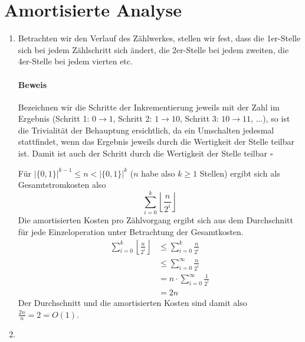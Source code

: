 \documentclass[a4paper,10pt]{article}
\begin{document}
\section{Amortisierte Analyse}
\begin{enumerate}
\item   Betrachten wir den Verlauf des Zählwerkes, stellen wir fest, dass die 1er-Stelle sich bei jedem Zählschritt sich 
        ändert, die 2er-Stelle bei jedem zweiten, die 4er-Stelle bei jedem vierten etc. 
        \paragraph*{Beweis} Bezeichnen wir die Schritte der Inkrementierung jeweils mit der Zahl im Ergebnis (Schritt 1: $0 \to 1$, Schritt 2: $1 \to 10$, Schritt 3: $10 \to 11$, ...), so ist die Trivialität der Behauptung ersichtlich, da ein Umschalten jedesmal stattfindet, wenn das Ergebnis jeweils durch die Wertigkeit der Stelle teilbar ist. Damit ist auch der Schritt durch die Wertigkeit der Stelle teilbar \hfill $\square$
        
        Für $\left|\{0,1\}\right|^{k-1} \leq n < \left|\{0,1\}\right|^{k}$ ($n$ habe also $k \geq 1$ Stellen) ergibt sich als Gesamtstromkosten also
        \[\sum\limits_{i=0}^{k} \left\lfloor\frac{n}{2^i}\right\rfloor\]
        Die amortisierten Kosten pro Zählvorgang ergibt sich aus dem Durchschnitt für jede Einzeloperation unter Betrachtung der Gesamtkosten.
        \begin{align*}
         \sum\limits_{i=0}^{k} \left\lfloor\frac{n}{2^i}\right\rfloor &\leq \sum\limits_{i=0}^{k} \frac{n}{2^i} \\
                                                                      &\leq \sum\limits_{i=0}^{\infty} \frac{n}{2^i} \\
                                                                      &= n \cdot \sum\limits_{i=0}^{\infty} \frac{1}{2^i} \\
                                                                      &= 2n
        \end{align*}
        Der Durchschnitt und die amortisierten Kosten sind damit also $\frac{2n}{n} = 2 = O(1)$.
\item   
\end{enumerate}
\end{document}
